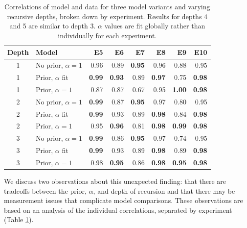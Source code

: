 \documentclass[man]{apa6}
\begin{document}
\begin{table}[ht]
\centering
\begin{tabular}{clrrrrrr}
  \hline
Depth & Model & E5 & E6 & E7 & E8 & E9 & E10 \\
  \hline
  1 & No prior, $\alpha=1$ & 0.96 & 0.89 & {\bf 0.95} & 0.96 & 0.88 & 0.95 \\
    1 & Prior, $\alpha$ fit & {\bf 0.99} & {\bf 0.93} & 0.89 & {\bf 0.97} & 0.75 & {\bf 0.98} \\
    1 & Prior, $\alpha=1$ & 0.87 & 0.87 & 0.67 & 0.95 & {\bf 1.00} & {\bf 0.98} \\
  \hline
    2 & No prior, $\alpha=1$ & {\bf 0.99} & 0.87 & {\bf 0.95} & 0.97 & 0.80 & 0.95 \\
    2 & Prior, $\alpha$ fit & {\bf 0.99} & 0.93 & 0.89 & {\bf 0.98} & 0.84 & {\bf 0.98} \\
    2 & Prior, $\alpha=1$ & 0.95 & {\bf 0.96} & 0.81 & {\bf 0.98} & {\bf 0.99} & {\bf 0.98} \\
  \hline
    3 & No prior, $\alpha=1$ & {\bf 0.99} & 0.86 & {\bf 0.95} & 0.97 & 0.74 & 0.95 \\
    3 & Prior, $\alpha$ fit & {\bf 0.99} & 0.93 & 0.89 & {\bf 0.98} & 0.89 & {\bf 0.98} \\
    3 & Prior, $\alpha=1$ & 0.98 & {\bf 0.95} & 0.86 & {\bf 0.98} & {\bf 0.95} & {\bf 0.98} \\
  \hline
\end{tabular}
\caption{\label{tab:expts-corrs} Correlations of model and data for three model variants and varying recursive depths, broken down by experiment. Results for depths 4 and 5 are similar to depth 3. $\alpha$ values are fit globally rather than individually for each experiment.}
\end{table}

We discuss two observations about this unexpected finding: that there are tradeoffs between the prior, $\alpha$, and depth of recursion and that there may be measurement issues that complicate model comparisons. These observations are based on an analysis of the individual correlations, separated by experiment (Table \ref{tab:expts-corrs}).
\end{document}

